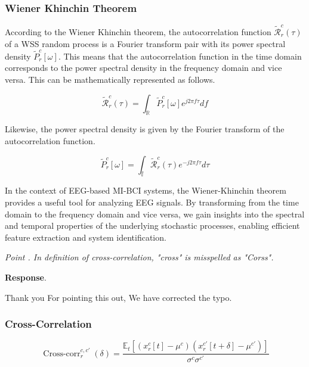\documentclass[runningheads]{llncs}
\newcommand{\Real}{\mathbb{R}}
\newenvironment{reviewer}{\setcounter{pointcounter}{1}}{}
\newcommand{\changes}[1]{\textcolor[rgb]{1.00,0.00,0.00}{#1}}
\newcommand{\point}[1]{\medskip \noindent
 \textsl{{\fontseries{b}\selectfont Point \thepointcounter}.
 \stepcounter{pointcounter} #1}}
\newcommand{\reply}{\medskip \noindent \textbf{Response}.\ }
\begin{document}
\begin{reviewer}
{        \subsubsection{Wiener Khinchin Theorem}
        
        According to the Wiener Khinchin theorem, the autocorrelation function \changes{$\mathcal{\tilde{R}}^{c}_{r}(\tau)$} of a WSS random process is a Fourier transform pair with its power spectral density \changes{$\tilde{P}^{c}_{r}[\omega]$}. This means that the autocorrelation function in the time domain corresponds to the power spectral density in the frequency domain and vice versa. This can be mathematically represented as follows.
        
        \changes{
        \begin{equation}
            \mathcal{\tilde{R}}^{c}_{r}(\tau) = \int_{\Real} \tilde{P}^{c}_{r}[\omega] e^{j 2\pi f \tau} df
        \end{equation}
        }
        
        Likewise, the power spectral density is given by the Fourier transform of the autocorrelation function.
        
        \changes{
        \begin{equation}
            \tilde{P}^{c}_{r}[\omega] = \int_{\mathbb{f}} \mathcal{\tilde{R}}^{c}_{r}(\tau) e^{-j 2\pi f \tau} d\tau
        \end{equation}
        }
        
        In the context of EEG-based MI-BCI systems, the Wiener-Khinchin theorem provides a useful tool for analyzing EEG signals. By transforming from the time domain to the frequency domain and vice versa, we gain insights into the spectral and temporal properties of the underlying stochastic processes, enabling efficient feature extraction and system identification.
}

\point{
    In definition of cross-correlation,  "cross" is misspelled as "Corss".
}

\reply{
    Thank you For pointing this out, We have corrected the typo.
    \changes{
    \subsubsection{Cross-Correlation}
    }
    
    \changes{
    \begin{equation}
        \operatorname{Cross-corr}^{c,c'}_{r}(\delta)=\frac{\mathbb{E}_{t}\left[ \left( x^{c}_{r} [t] - \mu^{c} \right) \left(x^{c'}_{r}[t+\delta]-\mu^{c'}\right)\right]}{\sigma^{c} \sigma^{c'}}
    \end{equation}
    }
}


\end{reviewer}
\end{document}
